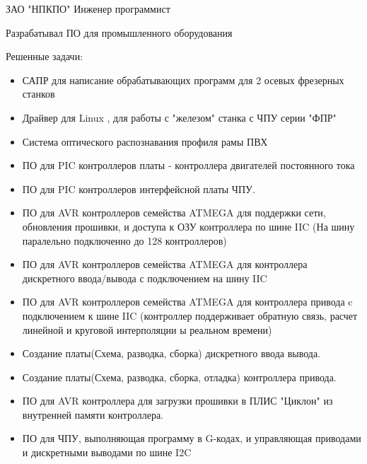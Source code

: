 
\jobdetail
{ЗАО "НПКПО"}
{Инженер программист}
{Разрабатывал ПО для промышленного оборудования

Решенные задачи:
\begin{itemize}
\item{САПР для написание обрабатывающих программ для 2 осевых фрезерных станков}
\item{Драйвер для Linux , для работы с "железом" станка с ЧПУ серии "ФПР"}
\item{Система оптического распознавания профиля рамы ПВХ}
\item{ПО для PIC контроллеров платы - контроллера двигателей постоянного тока }
\item{ПО для PIC контроллеров интерфейсной платы ЧПУ. }
\item{ПО для AVR контроллеров семейства ATMEGA для поддержки сети, обновления прошивки, и доступа к ОЗУ контроллера по шине IIC (На шину паралельно подключенно до 128 контроллеров)}
\item{ПО для AVR контроллеров семейства ATMEGA для контроллера дискретного ввода/вывода с подключением на шину IIC }
\item{ПО для AVR контроллеров семейства ATMEGA для контроллера привода c подключением к шине IIC (контроллер поддерживает обратную связь, расчет линейной и круговой интерполяции ы реальном времени) }
\item{Создание платы(Схема, разводка, сборка) дискретного ввода вывода. }
\item{Создание платы(Схема, разводка, сборка, отладка) контроллера привода. }
\item{ПО для AVR контроллера для загрузки прошивки в ПЛИС "Циклон" из внутренней памяти контроллера. }
\item{ПО для ЧПУ, выполняющая программу в G-кодах, и управляющая приводами и дискретными выводами по шине I2C}

\end{itemize}
}


